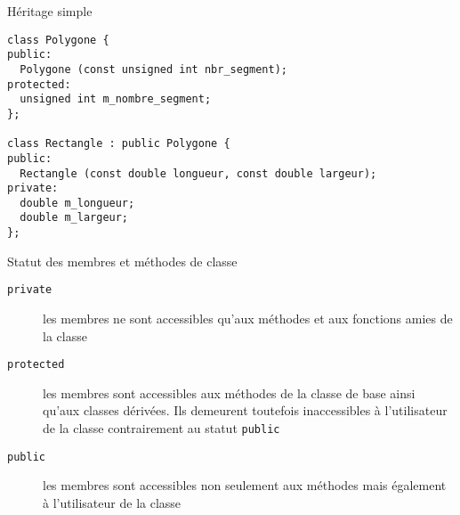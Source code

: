 \documentclass[c]{beamer}
\begin{document}

\begin{frame}[fragile]{Héritage simple}
 \begin{verbatim}
class Polygone {
public:
  Polygone (const unsigned int nbr_segment);
protected:
  unsigned int m_nombre_segment;
};

class Rectangle : public Polygone {
public:
  Rectangle (const double longueur, const double largeur);
private:
  double m_longueur;
  double m_largeur;
};
\end{verbatim}
\pause
{}

\pause
{}
\end{frame}



\begin{frame}[fragile]{Statut des membres et méthodes de classe}
 \begin{description}
\item[{\texttt{private}}] les membres ne sont accessibles qu'aux méthodes et aux fonctions
amies de la classe
\item[{\texttt{protected}}] les membres sont accessibles aux méthodes de la classe de base
ainsi qu'aux classes dérivées. Ils demeurent toutefois
inaccessibles à l'utilisateur de la classe contrairement au
statut \texttt{public}
\item[{\texttt{public}}] les membres sont accessibles non seulement aux méthodes mais
également à l'utilisateur de la classe
\end{description}
\end{frame}
\end{document}
